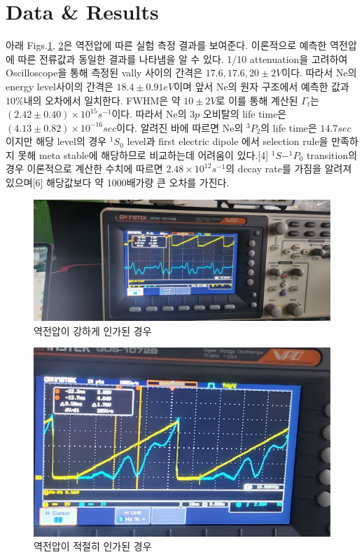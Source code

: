 \documentclass[%
 reprint,
 amsmath,amssymb,
 aps,
]{revtex4-2}
\begin{document}
\section{Data \& Results}
아래 Figs.\ref{fig:EXP1}, \ref{fig:EXP2}은 역전압에 따른 실험 측정 결과를 보여준다. 이론적으로 예측한 역전압에 따른 전류값과 동일한 결과를 나타냄을 알 수 있다. 1/10 attenuation을 고려하여 Oscilloscope을 통해 측정된 vally 사이의 간격은 $17.6, 17.6, 20\pm 2 V$이다. 따라서 Ne의 energy level사이의 간격은 $18.4\pm 0.91eV$이며 앞서 Ne의 원자 구조에서 예측한 값과 $10\%$내의 오차에서 일치한다. FWHM은 약 $10\pm2 V$로 이를 통해 계산된 $\Gamma_{t}$는 $(2.42\pm 0.40)\times10^{15}s^{-1}$이다. 따라서 Ne의 $3p$ 오비탈의 life time은 $(4.13\pm0.82)\times 10^{-16}sec$이다. 알려진 바에 따르면 Ne의 $^{3}P_{2}$의 life time은 $14.7sec$이지만 해당 level의 경우 $^{1}S_{0}$ level과 first electric dipole 에서 selection rule을 만족하지 못해 meta stable에 해당하므로 비교하는데 어려움이 있다.[4] $^{1}S - ^{1}P_{0}$ transition의 경우  이론적으로 계산한 수치에 따르면 $2.48\times10^{12}s^{-1}$의 decay rate를 가짐을 알려져 있으며[6] 해당값보다 약 1000배가량 큰 오차를 가진다. 
\begin{figure}[htbp]
	\includegraphics[width = 0.85\linewidth]{EXP1.png}%
	\caption{\label{fig:EXP1}역전압이 강하게 인가된 경우}
\end{figure}
\begin{figure}[htbp]
	\includegraphics[width = 0.85\linewidth]{EXP2.png}%
	\caption{\label{fig:EXP2}역전압이 적절히 인가된 경우}
\end{figure}
\end{document}
